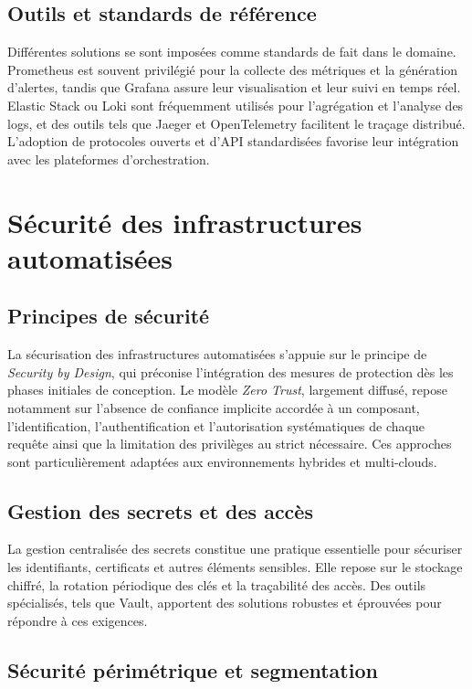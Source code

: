\subsection{Outils et standards de référence}

Différentes solutions se sont imposées comme standards de fait dans le domaine. Prometheus est souvent privilégié pour la collecte des métriques et la génération d’alertes, tandis que Grafana assure leur visualisation et leur suivi en temps réel. Elastic Stack ou Loki sont fréquemment utilisés pour l’agrégation et l’analyse des logs, et des outils tels que Jaeger et OpenTelemetry facilitent le traçage distribué. L’adoption de protocoles ouverts et d’API standardisées favorise leur intégration avec les plateformes d’orchestration.

\section{Sécurité des infrastructures automatisées}

\subsection{Principes de sécurité}

La sécurisation des infrastructures automatisées s’appuie sur le principe de \emph{Security by Design}, qui préconise l’intégration des mesures de protection dès les phases initiales de conception. Le modèle \emph{Zero Trust}, largement diffusé, repose notamment sur l’absence de confiance implicite accordée à un composant, l'identification, l’authentification et l’autorisation systématiques de chaque requête ainsi que la limitation des privilèges au strict nécessaire. Ces approches sont particulièrement adaptées aux environnements hybrides et multi-clouds.

\subsection{Gestion des secrets et des accès}

La gestion centralisée des secrets constitue une pratique essentielle pour sécuriser les identifiants, certificats et autres éléments sensibles. Elle repose sur le stockage chiffré, la rotation périodique des clés et la traçabilité des accès. Des outils spécialisés, tels que Vault, apportent des solutions robustes et éprouvées pour répondre à ces exigences.

\subsection{Sécurité périmétrique et segmentation}

